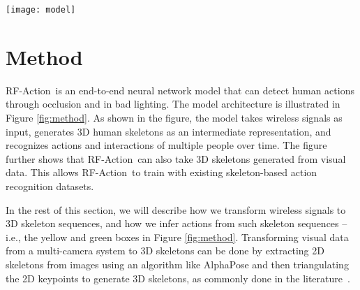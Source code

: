 \documentclass[10pt,twocolumn,letterpaper]{article}
\newcommand{\name} {RF-Action}
\begin{document}
 \begin{figure*}[t]
\begin{center}
\texttt{[image: model]}
\end{center}
\vspace{-10pt}
\caption{\footnotesize{\name\ architecture. \name\ detects human actions from wireless signals. It first extracts 3D skeletons for each person from raw wireless signal inputs (yellow box). It then performs action detection and recognition on the extracted skeleton sequences (green box). The Action Detection Framework can also take 3D skeletons generated from visual data as inputs (blue box), which enables training with both RF-generated skeletons and existing skeleton-based action recognition datasets.}}\label{fig:method}
\vspace{-10pt}
\end{figure*}


\section{Method}
\name\ is an end-to-end neural network model that can detect human actions through occlusion and in bad lighting. The model architecture is illustrated in Figure \ref{fig:method}. As shown in the figure, the model takes wireless signals as input, generates 3D human skeletons as an intermediate representation, and recognizes actions and interactions of multiple people over time. 
The figure further shows that \name\ can also take 3D skeletons generated from visual data. This allows \name\ to train with existing skeleton-based action recognition datasets. 


In the rest of this section, we will describe how we transform wireless signals to 3D skeleton sequences, and how we infer actions from such skeleton sequences --i.e., the yellow and green boxes in Figure \ref{fig:method}. Transforming visual data from a multi-camera system to 3D skeletons can be done by extracting 2D skeletons from images using an algorithm like AlphaPose and
then triangulating the 2D keypoints to generate 3D skeletons, as commonly done in the literature~\cite{hartley2003multiple,zhao2018rf}.
\end{document}
